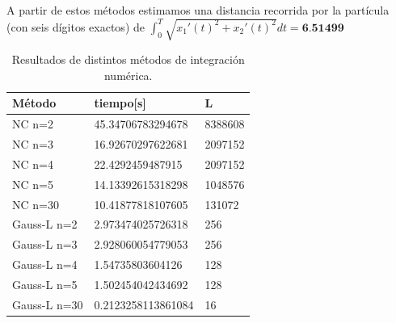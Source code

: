 \documentclass{article}
\begin{document}
    \indent A partir de estos métodos estimamos una distancia recorrida por la partícula (con seis dígitos exactos) de \(\int_{0}^{T} \sqrt{x_1'(t)^2+x_2'(t)^2}dt=\textbf{6.51499}\)
    \begin{table}[h]
        \centering
        \begin{tabular}{|l|l|l|}
            \hline
            \textbf{Método} & \textbf{tiempo{[}s{]}} & \textbf{L} \\ \hline
            NC n=2          & 45.34706783294678      & 8388608   \\ \hline
            NC n=3          & 16.92670297622681      & 2097152   \\ \hline
            NC n=4          & 22.4292459487915       & 2097152   \\ \hline
            NC n=5          & 14.13392615318298      & 1048576    \\ \hline
            NC n=30         & 10.41877818107605      & 131072    \\ \hline
            Gauss-L n=2     & 2.973474025726318      & 256        \\ \hline
            Gauss-L n=3     & 2.928060054779053      & 256        \\ \hline
            Gauss-L n=4     & 1.54735803604126       & 128        \\ \hline
            Gauss-L n=5     & 1.502454042434692      & 128        \\ \hline
            Gauss-L n=30    & 0.2123258113861084     & 16         \\ \hline
        \end{tabular}
        \caption{Resultados de distintos métodos de integración numérica.}
        \label{Tabla}
    \end{table}
\end{document}
